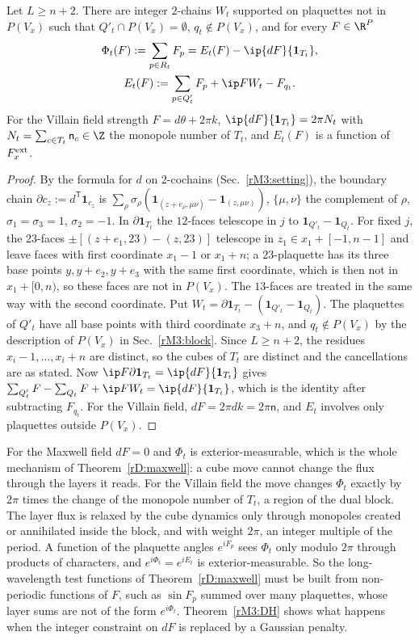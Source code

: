 \begin{lemma}\label{rM3:layer}
Let $L\ge n+2$. There are integer $2$-chains $W_t$ supported on plaquettes
not in $P(V_x)$ such that $Q'_t\cap P(V_x)=\emptyset$, $q_t\notin P(V_x)$,
and for every $F\in\R^P$
\begin{gather*}
\Phi_t(F):=\sum_{p\in R_t}F_p=E_t(F)-\ip{dF}{\mathbf 1_{T_t}},\\
E_t(F):=\sum_{p\in Q'_t}F_p+\ip F{W_t}-F_{q_t}.
\end{gather*}
For the Villain field strength $F=d\theta+2\pi k$, $\ip{dF}{\mathbf 1_{T_t}}
=2\pi N_t$ with $N_t=\sum_{c\in T_t}\mathsf n_c\in\Z$ the monopole number
of $T_t$, and $E_t(F)$ is a function of $F^{\rm ext}_x$.
\end{lemma}

\begin{proof}
By the formula for $d$ on $2$-cochains (Sec.~\ref{rM3:setting}), the
boundary chain $\partial c_z:=d^{\mathsf T}\mathbf 1_{c_z}$ is $\sum_\rho
\sigma_\rho(\mathbf 1_{(z+e_\rho,\mu\nu)}-\mathbf 1_{(z,\mu\nu)})$, $\{\mu,
\nu\}$ the complement of $\rho$, $\sigma_1=\sigma_3=1$, $\sigma_2=-1$. In
$\partial\mathbf 1_{T_t}$ the $12$-faces telescope in $j$ to $\mathbf 1_{Q'_t}-
\mathbf 1_{Q_t}$. For fixed $j$, the $23$-faces $\pm[(z+e_1,23)-(z,23)]$
telescope in $z_1\in x_1+[-1,n-1]$ and leave faces with first coordinate
$x_1-1$ or $x_1+n$; a $23$-plaquette has its three base points $y,y+e_2,
y+e_3$ with the same first coordinate, which is then not in $x_1+[0,n)$, so
these faces are not in $P(V_x)$. The $13$-faces are treated in the same way
with the second coordinate. Put $W_t=\partial\mathbf 1_{T_t}-(\mathbf 1_{Q'_t}
-\mathbf 1_{Q_t})$. The plaquettes of $Q'_t$ have all base points with third
coordinate $x_3+n$, and $q_t\notin P(V_x)$ by the description of
$P(V_x)$ in Sec.~\ref{rM3:block}. Since $L\ge n+2$, the residues
$x_i-1,\dots,x_i+n$ are distinct, so the cubes of $T_t$ are distinct and
the cancellations are as stated. Now $\ip F{\partial\mathbf 1_{T_t}}=\ip{dF}
{\mathbf 1_{T_t}}$ gives $\sum_{Q'_t}F-\sum_{Q_t}F+\ip F{W_t}=\ip{dF}{\mathbf
1_{T_t}}$, which is the identity after subtracting $F_{q_t}$. For the
Villain field, $dF=2\pi dk=2\pi\mathsf n$, and $E_t$ involves only
plaquettes outside $P(V_x)$.
\end{proof}

For the Maxwell field $dF=0$ and $\Phi_t$ is exterior-measurable, which is
the whole mechanism of Theorem~\ref{rD:maxwell}: a cube move cannot change
the flux through the layers it reads. For the Villain field the move
changes $\Phi_t$ exactly by $2\pi$ times the change of the monopole number
of $T_t$, a region of the dual block. The layer flux is relaxed by the
cube dynamics only through monopoles created or annihilated inside the
block, and with weight $2\pi$, an integer multiple of the period. A
function of the plaquette angles $e^{iF_p}$ sees $\Phi_t$ only modulo
$2\pi$ through products of characters, and $e^{i\Phi_t}=e^{iE_t}$ is
exterior-measurable. So the long-wavelength test functions of
Theorem~\ref{rD:maxwell} must be built from non-periodic functions of
$F$, such as $\sin F_p$ summed over many plaquettes, whose layer sums are
not of the form $e^{i\Phi_t}$. Theorem~\ref{rM3:DH} shows what happens when
the integer constraint on $dF$ is replaced by a Gaussian penalty.
